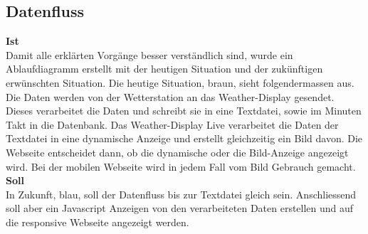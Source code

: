\subsection{Datenfluss}
\textbf{Ist}\\
Damit alle erklärten Vorgänge besser verständlich sind, wurde ein Ablaufdiagramm erstellt mit der heutigen Situation und der zukünftigen erwünschten Situation. Die heutige Situation, braun,  sieht folgendermassen aus. Die Daten werden von der Wetterstation an das Weather-Display gesendet. Dieses verarbeitet die Daten und schreibt sie in eine Textdatei, sowie im Minuten Takt in die Datenbank. Das Weather-Display Live verarbeitet die Daten der Textdatei in eine dynamische Anzeige und erstellt gleichzeitig ein Bild davon. Die Webseite entscheidet dann, ob die dynamische oder die Bild-Anzeige angezeigt wird. Bei der mobilen Webseite wird in jedem Fall vom Bild Gebrauch gemacht. \\
\textbf{Soll}\\
In Zukunft, blau, soll der Datenfluss bis zur Textdatei gleich sein. Anschliessend soll aber ein Javascript Anzeigen von den verarbeiteten Daten erstellen und auf die responsive Webseite angezeigt werden.\\





